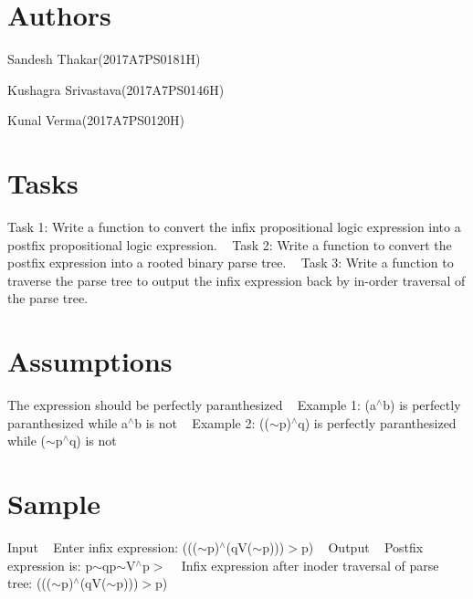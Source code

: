 \hypertarget{index_Authors}{}\section{Authors}\label{index_Authors}

\begin{DoxyEnumerate}
\item Sandesh Thakar(2017\+A7\+P\+S0181\+H)
\item Kushagra Srivastava(2017\+A7\+P\+S0146\+H)
\item Kunal Verma(2017\+A7\+P\+S0120\+H)
\end{DoxyEnumerate}\hypertarget{index_Tasks}{}\section{Tasks}\label{index_Tasks}
Task 1\+: Write a function to convert the infix propositional logic expression into a postfix propositional logic expression. ~\newline
 Task 2\+: Write a function to convert the postfix expression into a rooted binary parse tree. ~\newline
 Task 3\+: Write a function to traverse the parse tree to output the infix expression back by in-\/order traversal of the parse tree.\hypertarget{index_Assumptions}{}\section{Assumptions}\label{index_Assumptions}
The expression should be perfectly paranthesized ~\newline
 Example 1\+: (a$^\wedge$b) is perfectly paranthesized while a$^\wedge$b is not ~\newline
 Example 2\+: (($\sim$p)$^\wedge$q) is perfectly paranthesized while ($\sim$p$^\wedge$q) is not\hypertarget{index_Sample}{}\section{Sample}\label{index_Sample}
Input ~\newline
 Enter infix expression\+: ((($\sim$p)$^\wedge$(qV($\sim$p)))$>$p) ~\newline
 Output ~\newline
 Postfix expression is\+: p$\sim$qp$\sim$\+V$^\wedge$p$>$ ~\newline
 Infix expression after inoder traversal of parse tree\+: ((($\sim$p)$^\wedge$(qV($\sim$p)))$>$p) 